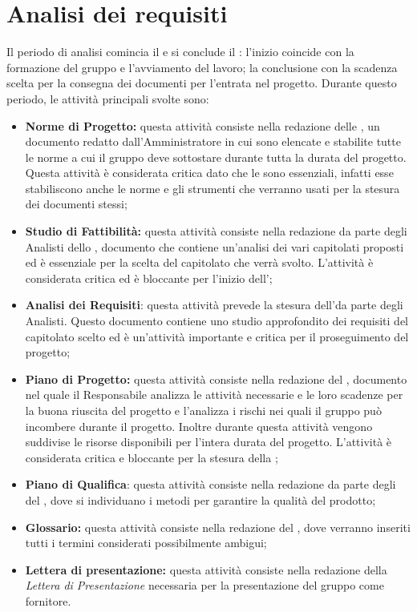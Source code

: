 \documentclass[PianoDiProgetto.tex]{subfiles}
\begin{document}
\section{Analisi dei requisiti}
Il periodo di analisi comincia il  e si conclude il : l'inizio coincide con la formazione del gruppo e l'avviamento del lavoro; la conclusione con la scadenza scelta per la consegna dei documenti per l'entrata nel progetto. Durante questo periodo, le attività principali svolte sono:
\begin{itemize}
	\item \textbf{Norme di Progetto:} questa attività consiste nella redazione delle \ndp, un documento redatto dall'Amministratore in cui sono elencate e stabilite tutte le norme a cui il gruppo \gruppo deve sottostare durante tutta la durata del progetto. Questa attività è considerata critica dato che le \ndp sono essenziali, infatti esse stabiliscono anche le norme e gli strumenti che verranno usati per la stesura dei documenti stessi;
	\item \textbf{Studio di Fattibilità:} questa attività consiste nella redazione da parte degli Analisti dello \sdf, documento che contiene un'analisi dei vari capitolati proposti ed è essenziale per la scelta del capitolato che verrà svolto. L'attività è considerata critica ed è bloccante per l'inizio dell'\adr;
	
	\item \textbf{Analisi dei Requisiti}: questa attività prevede la stesura dell'\adr da parte degli Analisti. Questo documento contiene uno studio approfondito dei requisiti del capitolato scelto ed è un'attività importante e critica per il proseguimento del progetto;
	
	\item \textbf{Piano di Progetto:} questa attività consiste nella redazione del \pdp, documento nel quale il Responsabile analizza le attività necessarie e le loro scadenze per la buona riuscita del progetto e l'\amme analizza i rischi nei quali il gruppo \gruppo può incombere durante il progetto. Inoltre durante questa attività vengono suddivise le risorse disponibili per l'intera durata del progetto. L'attività è considerata critica e bloccante per la stesura della ;
	\item \textbf{Piano di Qualifica}: questa attività consiste nella redazione da parte degli \ammi del \pdq, dove si individuano i metodi per garantire la qualità del prodotto;
	\item \textbf{Glossario:} questa attività consiste nella redazione del \g, dove verranno inseriti tutti i termini considerati possibilmente ambigui;
	\item \textbf{Lettera di presentazione:} questa attività consiste nella redazione della \textit{Lettera di Presentazione} necessaria per la presentazione del gruppo \gruppo come fornitore. 	
\end{itemize}	
\end{document}
